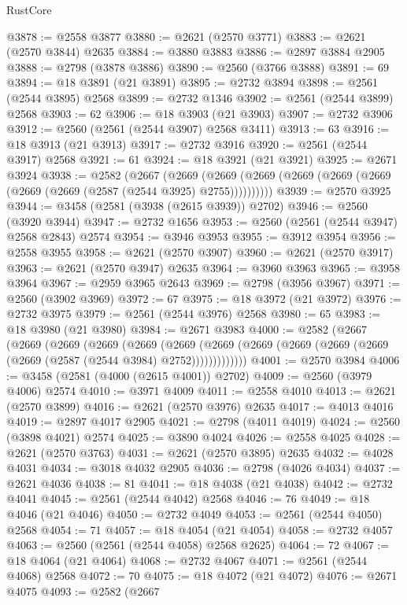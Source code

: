 \begin{lexlean}{RustCore}
\begin{coremodule}
@3878 := @2558 @3877
@3880 := @2621 (@2570 @3771)
@3883 := @2621 (@2570 @3844) @2635
@3884 := @3880 @3883
@3886 := @2897 @3884 @2905
@3888 := @2798 (@3878 @3886)
@3890 := @2560 (@3766 @3888)
@3891 := 69
@3894 := @18 @3891 (@21 @3891)
@3895 := @2732 @3894
@3898 := @2561 (@2544 @3895) @2568
@3899 := @2732 @1346
@3902 := @2561 (@2544 @3899) @2568
@3903 := 62
@3906 := @18 @3903 (@21 @3903)
@3907 := @2732 @3906
@3912 := @2560 (@2561 (@2544 @3907) @2568 @3411)
@3913 := 63
@3916 := @18 @3913 (@21 @3913)
@3917 := @2732 @3916
@3920 := @2561 (@2544 @3917) @2568
@3921 := 61
@3924 := @18 @3921 (@21 @3921)
@3925 := @2671 @3924
@3938 := @2582
    (@2667
      (@2669 (@2669 (@2669 (@2669 (@2669 (@2669 (@2669 (@2669 (@2587 (@2544 @3925) @2755))))))))))
@3939 := @2570 @3925
@3944 := @3458 (@2581 (@3938 (@2615 @3939)) @2702)
@3946 := @2560 (@3920 @3944)
@3947 := @2732 @1656
@3953 := @2560 (@2561 (@2544 @3947) @2568 @2843) @2574
@3954 := @3946 @3953
@3955 := @3912 @3954
@3956 := @2558 @3955
@3958 := @2621 (@2570 @3907)
@3960 := @2621 (@2570 @3917)
@3963 := @2621 (@2570 @3947) @2635
@3964 := @3960 @3963
@3965 := @3958 @3964
@3967 := @2959 @3965 @2643
@3969 := @2798 (@3956 @3967)
@3971 := @2560 (@3902 @3969)
@3972 := 67
@3975 := @18 @3972 (@21 @3972)
@3976 := @2732 @3975
@3979 := @2561 (@2544 @3976) @2568
@3980 := 65
@3983 := @18 @3980 (@21 @3980)
@3984 := @2671 @3983
@4000 := @2582
    (@2667
      (@2669
        (@2669
          (@2669
            (@2669
              (@2669
                (@2669 (@2669 (@2669 (@2669 (@2669 (@2669 (@2587 (@2544 @3984) @2752)))))))))))))
@4001 := @2570 @3984
@4006 := @3458 (@2581 (@4000 (@2615 @4001)) @2702)
@4009 := @2560 (@3979 @4006) @2574
@4010 := @3971 @4009
@4011 := @2558 @4010
@4013 := @2621 (@2570 @3899)
@4016 := @2621 (@2570 @3976) @2635
@4017 := @4013 @4016
@4019 := @2897 @4017 @2905
@4021 := @2798 (@4011 @4019)
@4024 := @2560 (@3898 @4021) @2574
@4025 := @3890 @4024
@4026 := @2558 @4025
@4028 := @2621 (@2570 @3763)
@4031 := @2621 (@2570 @3895) @2635
@4032 := @4028 @4031
@4034 := @3018 @4032 @2905
@4036 := @2798 (@4026 @4034)
@4037 := @2621 @4036
@4038 := 81
@4041 := @18 @4038 (@21 @4038)
@4042 := @2732 @4041
@4045 := @2561 (@2544 @4042) @2568
@4046 := 76
@4049 := @18 @4046 (@21 @4046)
@4050 := @2732 @4049
@4053 := @2561 (@2544 @4050) @2568
@4054 := 71
@4057 := @18 @4054 (@21 @4054)
@4058 := @2732 @4057
@4063 := @2560 (@2561 (@2544 @4058) @2568 @2625)
@4064 := 72
@4067 := @18 @4064 (@21 @4064)
@4068 := @2732 @4067
@4071 := @2561 (@2544 @4068) @2568
@4072 := 70
@4075 := @18 @4072 (@21 @4072)
@4076 := @2671 @4075
@4093 := @2582
    (@2667

\end{coremodule}
\end{lexlean}
